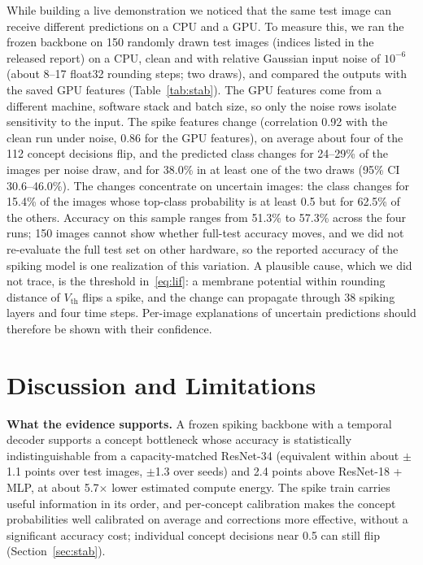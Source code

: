 \documentclass[conference]{IEEEtran}
\begin{document}
While building a live demonstration we noticed that the same test image can receive different predictions on a CPU and a GPU. To measure this, we ran the frozen backbone on 150 randomly drawn test images (indices listed in the released report) on a CPU, clean and with relative Gaussian input noise of $10^{-6}$ (about 8--17 float32 rounding steps; two draws), and compared the outputs with the saved GPU features (Table~\ref{tab:stab}). The GPU features come from a different machine, software stack and batch size, so only the noise rows isolate sensitivity to the input. The spike features change (correlation 0.92 with the clean run under noise, 0.86 for the GPU features), on average about four of the 112 concept decisions flip, and the predicted class changes for 24--29\% of the images per noise draw, and for 38.0\% in at least one of the two draws (95\% CI 30.6--46.0\%). The changes concentrate on uncertain images: the class changes for 15.4\% of the images whose top-class probability is at least 0.5 but for 62.5\% of the others. Accuracy on this sample ranges from 51.3\% to 57.3\% across the four runs; 150 images cannot show whether full-test accuracy moves, and we did not re-evaluate the full test set on other hardware, so the reported accuracy of the spiking model is one realization of this variation. A plausible cause, which we did not trace, is the threshold in~\eqref{eq:lif}: a membrane potential within rounding distance of $V_{\mathrm{th}}$ flips a spike, and the change can propagate through 38 spiking layers and four time steps. Per-image explanations of uncertain predictions should therefore be shown with their confidence.

\section{Discussion and Limitations}

\textbf{What the evidence supports.} A frozen spiking backbone with a temporal decoder supports a concept bottleneck whose accuracy is statistically indistinguishable from a capacity-matched ResNet-34 (equivalent within about $\pm$1.1 points over test images, $\pm$1.3 over seeds) and 2.4 points above ResNet-18 + MLP, at about 5.7$\times$ lower estimated compute energy. The spike train carries useful information in its order, and per-concept calibration makes the concept probabilities well calibrated on average and corrections more effective, without a significant accuracy cost; individual concept decisions near 0.5 can still flip (Section~\ref{sec:stab}).
\end{document}
